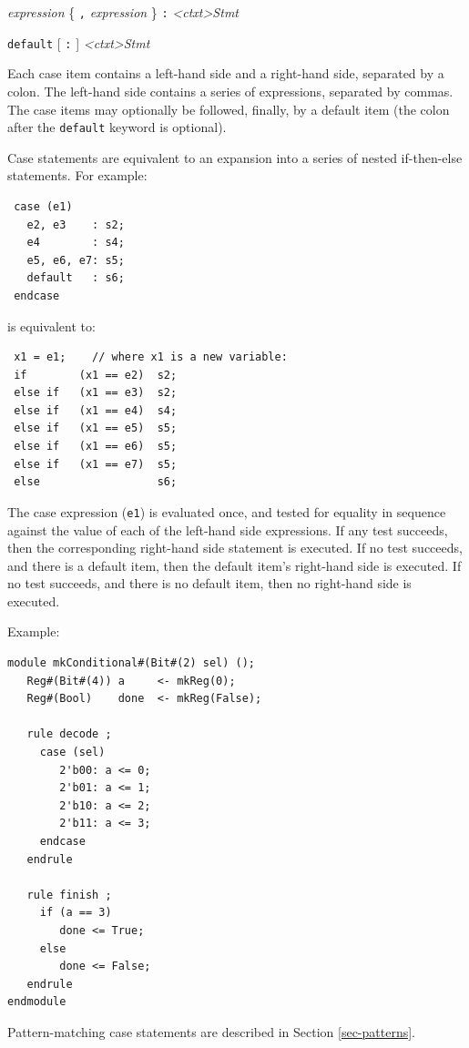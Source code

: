 \documentclass[twoside,letterpaper]{article}
\newcommand{\hm}{\hspace*{1em}}
\newcommand{\nterm}[1]{\emph{#1}}
\newcommand{\term}[1]{\texttt{#1}}
\newcommand{\many}[1]{\{ #1 \}}
\newcommand{\opt}[1]{[ #1 ]}
\newcommand{\gram}[2]{    \hm\makebox[10em][l]{\it #1}\makebox[1.5em][l]{::=}    #2}
\begin{document}
\gram{<ctxt>CaseItem}{ \nterm{expression} \many{ \term{,} \nterm{expression} }
                       \term{:}
                       \nterm{<ctxt>Stmt} }

\gram{<ctxt>DefaultItem}{ \term{default} \opt{ \term{:} } \nterm{<ctxt>Stmt} }

Each case item contains a left-hand side and a right-hand side,
separated by a colon.  The left-hand side contains a series of
expressions, separated by commas. The case items may optionally be
followed, finally, by a default item (the colon after the
\term{default} keyword is optional).

Case statements are equivalent to an expansion into a series of nested
if-then-else statements.  For example:
\begin{verbatim}
 case (e1)
   e2, e3    : s2;
   e4        : s4;
   e5, e6, e7: s5;
   default   : s6;
 endcase
\end{verbatim}
is equivalent to:
\begin{verbatim}
 x1 = e1;    // where x1 is a new variable:
 if        (x1 == e2)  s2;
 else if   (x1 == e3)  s2;
 else if   (x1 == e4)  s4;
 else if   (x1 == e5)  s5;
 else if   (x1 == e6)  s5;
 else if   (x1 == e7)  s5;
 else                  s6;
\end{verbatim}
The case expression (\term{e1}) is evaluated once, and tested for
equality in sequence against the value of each of the left-hand side
expressions.  If any test succeeds, then the corresponding right-hand
side statement is executed.  If no test succeeds, and there is a
default item, then the default item's right-hand side is executed.  If
no test succeeds, and there is no default item, then no right-hand
side is executed.

Example:
\begin{verbatim}
module mkConditional#(Bit#(2) sel) ();
   Reg#(Bit#(4)) a     <- mkReg(0);
   Reg#(Bool)    done  <- mkReg(False);
   
   rule decode ;
     case (sel)
        2'b00: a <= 0;
        2'b01: a <= 1;
        2'b10: a <= 2;
        2'b11: a <= 3;
     endcase
   endrule

   rule finish ;
     if (a == 3)
        done <= True;
     else
        done <= False;
   endrule
endmodule
\end{verbatim}


Pattern-matching case statements are described in Section
{\ref{sec-patterns}}.

\end{document}
